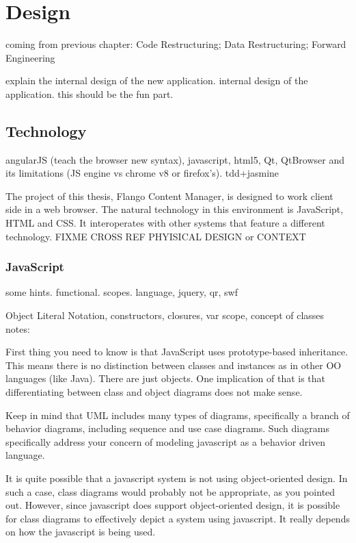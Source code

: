 \chapter{Design}
coming from previous chapter: Code Restructuring; Data Restructuring; Forward Engineering
    
    
explain the internal design of the new application.
internal design of the application. this should be the fun part.

\section{Technology}
angularJS (teach the browser new syntax), javascript, html5, Qt, QtBrowser and its limitations (JS engine vs chrome v8 or firefox's). tdd+jasmine

The project of this thesis, Flango Content Manager, is designed to work client side in a web browser.
The natural technology in this environment is JavaScript, HTML and CSS.
It interoperates with other systems that feature a different technology. FIXME CROSS REF PHYISICAL DESIGN or CONTEXT



\subsection{JavaScript}
some hints. functional. scopes.
language, jquery, qr, swf

Object Literal Notation, constructors, closures, var scope, concept of classes
notes:

First thing you need to know is that JavaScript uses prototype-based inheritance. This means there is no distinction between classes and instances as in other OO languages (like Java). There are just objects. One implication of that is that differentiating between class and object diagrams does not make sense.

Keep in mind that UML includes many types of diagrams, specifically a branch of behavior diagrams, including sequence and use case diagrams. Such diagrams specifically address your concern of modeling javascript as a behavior driven language.

It is quite possible that a javascript system is not using object-oriented design. In such a case, class diagrams would probably not be appropriate, as you pointed out. However, since javascript does support object-oriented design, it is possible for class diagrams to effectively depict a system using javascript. It really depends on how the javascript is being used.

